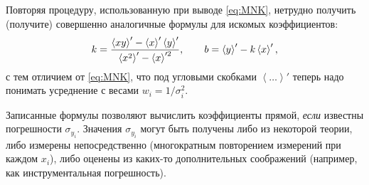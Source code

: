 Повторяя процедуру, использованную при выводе \eqref{eq:MNK}, нетрудно
получить (получите) совершенно аналогичные формулы для искомых коэффициентов:
\begin{equation}
k=\frac{\average{xy}' - \average{x}'\average{y}'}%
    {\average{x^2}' - \average{x}'^2},\qquad
    b=\average{y}' -k \average{x}',\label{eq:MMP}
\end{equation}
с тем отличием от \eqref{eq:MNK}, что под угловыми скобками
$\left\langle \ldots\right\rangle'$
теперь надо понимать усреднение с весами $w_{i}=1/\sigma_{i}^{2}$.

Записанные формулы позволяют вычислить коэффициенты прямой,
\emph{если} известны погрешности $\sigma_{y_{i}}$. Значения $\sigma_{y_{i}}$
могут быть получены либо из некоторой теории, либо измерены непосредственно
(многократным повторением измерений при каждом $x_{i}$), либо оценены из
каких-то дополнительных соображений (например, как инструментальная погрешность).